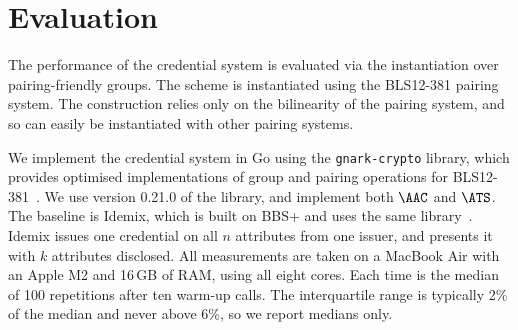 \section{Evaluation}\label{sec:agg-creds-evaluation}

The performance of the credential system is evaluated via the instantiation over
pairing-friendly groups. The scheme is instantiated using the BLS12-381 pairing
system. The construction relies only on the bilinearity of the pairing system,
and so can easily be instantiated with other pairing systems.

We implement the credential system in Go using the \texttt{gnark-crypto}
library, which provides optimised implementations of group and pairing
operations for BLS12-381~\cite{gnark-crypto}.
We use version 0.21.0 of the library, and implement both $\AAC$ and $\ATS$.
The baseline is Idemix, which is built on BBS+ and uses the same
library~\cite{CCS:CamVan02}. Idemix issues one credential on all $n$ attributes
from one issuer, and presents it with $k$ attributes disclosed. All measurements
are taken on a MacBook Air with an Apple M2 and 16\,GB of RAM, using all eight
cores. Each time is the median of 100 repetitions after ten warm-up calls. The
interquartile range is typically 2\% of the median and never above 6\%, so we
report medians only.

